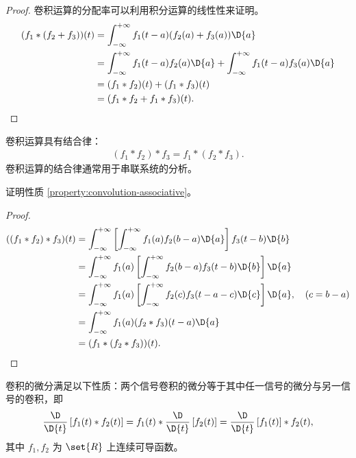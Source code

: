 \begin{proof}
    卷积运算的分配率可以利用积分运算的线性性来证明。
    \begin{align*}
        (f_1 * (f_2 + f_3))(t) & = \int_{-\infty}^{+\infty}f_1(t - a)(f_2(a) + f_3(a))\D{a} \\
        & = \int_{-\infty}^{+\infty}f_1(t - a)f_2(a)\D{a} + \int_{-\infty}^{+\infty}f_1(t - a)f_3(a)\D{a} \\
        & = (f_1 * f_2)(t) + (f_1 * f_3)(t) \\
        & = (f_1 * f_2 + f_1 * f_3)(t).
    \end{align*}
\end{proof}

\begin{property}[卷积运算的结合律]
    \label{property:convolution-associative}
    卷积运算具有结合律：
    \begin{align*}
        (f_1 * f_2) * f_3 = f_1 * (f_2 * f_3).
    \end{align*}
    卷积运算的结合律通常用于串联系统的分析。
\end{property}

\begin{exercise}
    证明性质 \ref{property:convolution-associative}。
\end{exercise}

\begin{proof}
    \begin{align*}
        ((f_1 * f_2) * f_3)(t) & = \int_{-\infty}^{+\infty}\left[\int_{-\infty}^{+\infty}f_1(a) f_2(b - a)\D{a}\right]f_3(t - b)\D{b} \\
        & = \int_{-\infty}^{+\infty}f_1(a)\left[\int_{-\infty}^{+\infty}f_2(b - a)f_3(t - b)\D{b}\right]\D{a} \\
        & = \int_{-\infty}^{+\infty}f_1(a)\left[\int_{-\infty}^{+\infty}f_2(c)f_3(t - a - c)\D{c}\right]\D{a}, \quad (c = b - a) \\
        & = \int_{-\infty}^{+\infty}f_1(a)(f_2 * f_3)(t - a)\D{a} \\
        & = (f_1 * (f_2 * f_3))(t).
    \end{align*}
\end{proof}

\begin{property}[卷积的微分性质]
    \label{property:convolution-differential}
    卷积的微分满足以下性质：两个信号卷积的微分等于其中任一信号的微分与另一信号的卷积，即
    \begin{align*}
        \frac{\D}{\D{t}}\left[f_1(t) * f_2(t)\right]
        = f_1(t) * \frac{\D}{\D{t}}\left[f_2(t)\right]
        = \frac{\D}{\D{t}}\left[f_1(t)\right] * f_2(t),
    \end{align*}
    其中 $f_1, f_2$ 为  $\set{R}$ 上连续可导函数。
\end{property}

